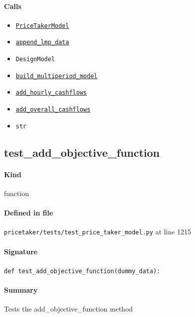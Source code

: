 \documentclass[11pt]{report}
\begin{document}
\paragraph{Calls}
\begin{itemize}[leftmargin=*]
  \item \hyperref[def:pricetaker-price_taker_model.py:PriceTakerModel:L161]{\texttt{PriceTakerModel}}
  \item \hyperref[def:pricetaker-price_taker_model.py:PriceTakerModel.append_lmp_data:L221]{\texttt{append\_lmp\_data}}
  \item \texttt{DesignModel}
  \item \hyperref[def:pricetaker-price_taker_model.py:PriceTakerModel.build_multiperiod_model:L291]{\texttt{build\_multiperiod\_model}}
  \item \hyperref[def:pricetaker-price_taker_model.py:PriceTakerModel.add_hourly_cashflows:L897]{\texttt{add\_hourly\_cashflows}}
  \item \hyperref[def:pricetaker-price_taker_model.py:PriceTakerModel.add_overall_cashflows:L997]{\texttt{add\_overall\_cashflows}}
  \item \texttt{str}
\end{itemize}
\subsection{test\_add\_objective\_function}
\label{def:pricetaker-tests-test_price_taker_model.py:test_add_objective_function:L1215}
\paragraph{Kind} function
\paragraph{Defined in file} \texttt{pricetaker/tests/test\_price\_taker\_model.py} at line 1215
\paragraph{Signature} \texttt{def test\_add\_objective\_function(dummy\_data):}
\paragraph{Summary} Tests the add\_objective\_function method
\end{document}
